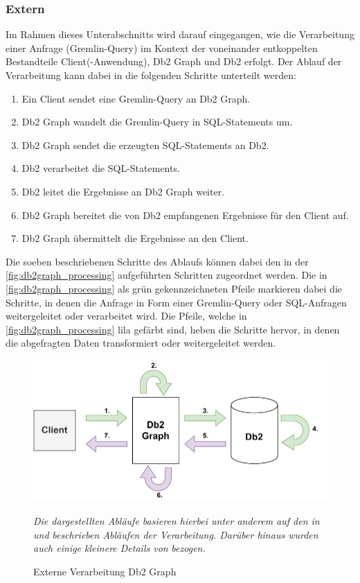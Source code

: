 \subsubsection{Extern}
Im Rahmen dieses Unterabschnitts wird darauf eingegangen, wie die Verarbeitung einer Anfrage (Gremlin-Query) im Kontext der voneinander entkoppelten Bestandteile Client(-Anwendung), Db2 Graph und Db2 erfolgt. Der Ablauf der Verarbeitung kann dabei in die folgenden Schritte unterteilt werden: 
\begin{enumerate}
    \item Ein Client sendet eine Gremlin-Query an Db2 Graph. 
    \item Db2 Graph wandelt die Gremlin-Query in SQL-Statements um. 
    \item Db2 Graph sendet die erzeugten SQL-Statements an Db2.
    \item Db2 verarbeitet die SQL-Statements.
    \item Db2 leitet die Ergebnisse an Db2 Graph weiter.
    \item Db2 Graph bereitet die von Db2 empfangenen Ergebnisse für den Client auf. 
    \item Db2 Graph übermittelt die Ergebnisse an den Client.
\end{enumerate}

Die soeben beschriebenen Schritte des Ablaufs können dabei den in der \autoref{fig:db2graph_processing} aufgeführten Schritten zugeordnet werden. Die in \autoref{fig:db2graph_processing} als grün gekennzeichneten Pfeile markieren dabei die Schritte, in denen die Anfrage in Form einer Gremlin-Query oder SQL-Anfragen weitergeleitet oder verarbeitet wird. Die Pfeile, welche in \autoref{fig:db2graph_processing} lila gefärbt sind, heben die Schritte hervor, in denen die abgefragten Daten transformiert oder weitergeleitet werden.

\begin{figure}[ht]
    \centering
    \includegraphics[width=\textwidth]{images/db2graph_processing.pdf}
    \caption{Externe Verarbeitung Db2 Graph}
    \label{fig:db2graph_processing}
    \vspace{1em}
    \textit{Die dargestellten Abläufe basieren hierbei unter anderem auf den in} \cite{vldb_tian} \textit{und} \cite{sigmod_tian} \textit{beschrieben Abläufen der Verarbeitung. Darüber hinaus wurden auch einige kleinere Details von} \cite{tinkerpop_2020} \textit{bezogen.} 
\end{figure}

